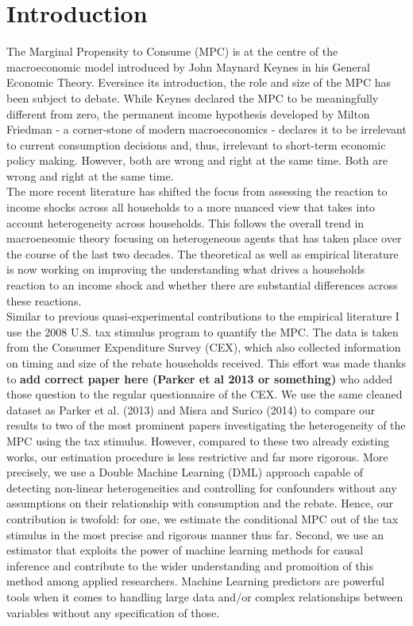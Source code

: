 \section{Introduction} \label{sec:intro}
The Marginal Propensity to Consume (MPC) is at the centre of the macroeconomic model introduced by John Maynard Keynes in his General Economic Theory. Eversince its introduction, the role and size of the MPC has been subject to debate. While Keynes declared the MPC to be meaningfully different from zero, the permanent income hypothesis developed by Milton Friedman - a corner-stone of modern macroeconomics - declares it to be irrelevant to current consumption decisions and, thus, irrelevant to short-term economic policy making. However, both are wrong and right at the same time. Both are wrong and right at the same time. \\
The more recent literature has shifted the focus from assessing the reaction to income shocks across all households to a more nuanced view that takes into account heterogeneity across households. This follows the overall trend in macroeneomic theory focusing on heterogeneous agents that has taken place over the course of the last two decades. The theoretical as well as empirical literature is now working on improving the understanding what drives a households reaction to an income shock and whether there are substantial differences across these reactions. \\
Similar to previous quasi-experimental contributions to the empirical literature I use the 2008 U.S. tax stimulus program to quantify the MPC. The data is taken from the Consumer Expenditure Survey (CEX), which also collected information on timing and size of the rebate households received. This effort was made thanks to \textbf{add correct paper here (Parker et al 2013 or something)} who added those question to the regular questionnaire of the CEX. We use the same cleaned dataset as Parker et al. (2013) and Misra and Surico (2014) to compare our results to two of the most prominent papers investigating the heterogeneity of the MPC using the tax stimulus. However, compared to these two already existing works, our estimation procedure is less restrictive and far more rigorous. More precisely, we use a Double Machine Learning (DML) approach capable of detecting non-linear heterogeneities and controlling for confounders without any assumptions on their relationship with consumption and the rebate. Hence, our contribution is twofold: for one, we estimate the conditional MPC out of the tax stimulus in the most precise and rigorous manner thus far. Second, we use an estimator that exploits the power of machine learning methods for causal inference and contribute to the wider understanding and promoition of this method among applied researchers. Machine Learning predictors are powerful tools when it comes to handling large data and/or complex relationships between variables without any specification of those. \\
